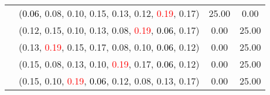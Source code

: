 \documentclass[10pt,a4paper]{report}
\begin{document}
\begin{center}
\begin{longtable}{clcc}
			&(\textcolor{black}{0.06}, 0.08, 0.10, 0.15, 0.13, 0.12, \textcolor{red}{0.19}, 0.17)&25.00&0.00\\
			&(0.12, 0.15, 0.10, 0.13, 0.08, \textcolor{red}{0.19}, \textcolor{black}{0.06}, 0.17)&0.00&25.00\\
			&(0.13, \textcolor{red}{0.19}, 0.15, 0.17, 0.08, 0.10, \textcolor{black}{0.06}, 0.12)&0.00&25.00\\
			&(0.15, 0.08, 0.13, 0.10, \textcolor{red}{0.19}, 0.17, \textcolor{black}{0.06}, 0.12)&0.00&25.00\\
			&(0.15, 0.10, \textcolor{red}{0.19}, \textcolor{black}{0.06}, 0.12, 0.08, 0.13, 0.17)&0.00&25.00\\
		\bottomrule
	\end{longtable}
\end{center}
\newpage
\end{document}
